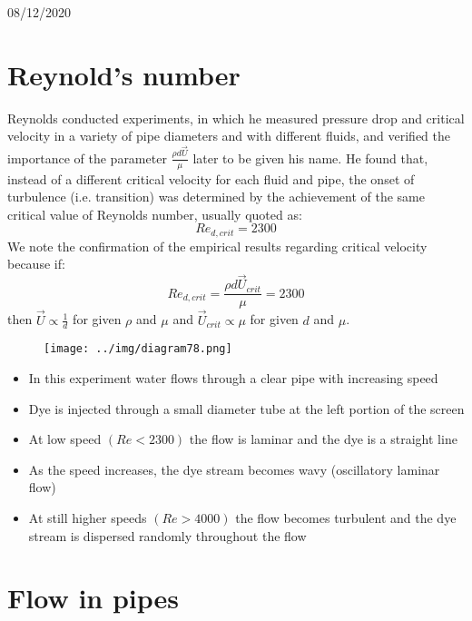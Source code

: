 \documentclass[class=report, crop=false, 12pt,a4paper]{standalone}
\begin{document}
\begin{center}
    08/12/2020
\end{center}
\section{Reynold's number}
Reynolds conducted experiments, in which he measured pressure drop and critical velocity in a variety of pipe diameters and with different fluids, and verified the importance of the parameter $\frac{\rho d \vec{U}}{\mu}$ later to be given his name. He found that, instead of a different critical velocity for each fluid and pipe, the onset of turbulence (i.e. transition) was determined by the achievement of the same critical value of Reynolds number, usually quoted as:
\begin{equation}
  Re_{d,crit} = 2300
\end{equation}
We note the confirmation of the empirical results regarding critical velocity because if:
\begin{equation}
  Re_{d,crit} = \frac{\rho d \vec{U}_{crit}}{\mu} = 2300
\end{equation}
then $\vec{U} \propto \frac{1}{d}$ for given $\rho$ and $\mu$ and $\vec{U}_{crit} \propto \mu$ for given $d$ and $\mu$.
\begin{figure}[H]
  \centering
  \texttt{[image: ../img/diagram78.png]}
  \caption{}
\end{figure}
\begin{itemize}[noitemsep]
  \item In this experiment water flows through a clear pipe with increasing speed
  \item Dye is injected through a small diameter tube at the left portion of the screen
  \item At low speed $ \left( Re < 2300 \right)$ the flow is laminar and the dye is a straight line
  \item As the speed increases, the dye stream becomes wavy (oscillatory laminar flow)
  \item At still higher speeds $\left(Re > 4000\right)$ the flow becomes turbulent and the dye stream is dispersed randomly throughout the flow
\end{itemize}
\section{Flow in pipes}
\end{document}

